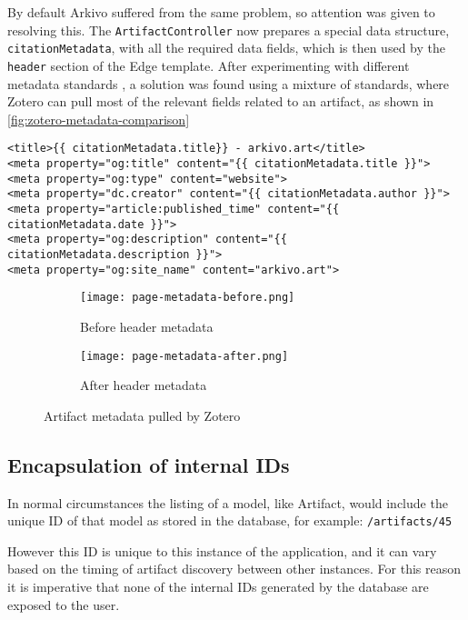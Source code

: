 By default Arkivo suffered from the same problem, so attention was given to resolving this.
The \texttt{ArtifactController} now prepares a special data structure, \texttt{citationMetadata}, with all the required data fields, which is then used by the \texttt{header} section of the Edge template.
After experimenting with different metadata standards \cite{DevExposing_metadataZotero}\cite{zahidOpenGraphMeta2023} , a solution was found using a mixture of standards, where Zotero can pull most of the relevant fields related to an artifact, as shown in \autoref{fig:zotero-metadata-comparison}


\begin{lstlisting}[style=htmlCode,caption={Artifact page metadata}] 
<title>{{ citationMetadata.title}} - arkivo.art</title>
<meta property="og:title" content="{{ citationMetadata.title }}">
<meta property="og:type" content="website">
<meta property="dc.creator" content="{{ citationMetadata.author }}">
<meta property="article:published_time" content="{{ citationMetadata.date }}">
<meta property="og:description" content="{{ citationMetadata.description }}">
<meta property="og:site_name" content="arkivo.art">
\end{lstlisting}


\begin{figure}[H]
  \centering
  \begin{subfigure}[b]{0.45\textwidth}
    \centering
    \texttt{[image: page-metadata-before.png]}
    \caption{Before header metadata}
    \label{fig:image1}
  \end{subfigure}
  \hfill
  \begin{subfigure}[b]{0.45\textwidth}
    \centering
    \texttt{[image: page-metadata-after.png]}
    \caption{After header metadata}
    \label{fig:image2}
  \end{subfigure}
  \caption{Artifact metadata pulled by Zotero}
  \label{fig:zotero-metadata-comparison}
\end{figure}



\subsection{Encapsulation of internal IDs}

In normal circumstances the listing of a model, like Artifact, would include the unique ID of that model as stored in the database, for example: \texttt{/artifacts/45}

However this ID is unique to this instance of the application, and it can vary based on the timing of artifact discovery between other instances.
For this reason it is imperative that none of the internal IDs generated by the database are exposed to the user.

